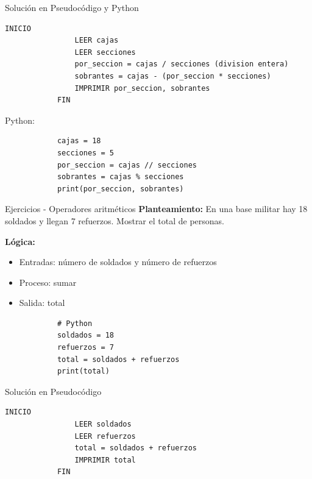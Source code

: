 \documentclass{beamer}
\begin{document}
    \begin{frame}[fragile]{Solución en Pseudocódigo y Python}
        \begin{lstlisting}[language=PseudocodigoES]
            INICIO
                LEER cajas
                LEER secciones
                por_seccion = cajas / secciones (division entera)
                sobrantes = cajas - (por_seccion * secciones)
                IMPRIMIR por_seccion, sobrantes
            FIN
        \end{lstlisting}
        Python:
        \begin{verbatim}
            cajas = 18
            secciones = 5
            por_seccion = cajas // secciones
            sobrantes = cajas % secciones
            print(por_seccion, sobrantes)
        \end{verbatim}
    \end{frame}

    \begin{frame}[fragile,t]{Ejercicios - Operadores aritméticos}
        \textbf{Planteamiento:} En una base militar hay 18 soldados y llegan 7 refuerzos. Mostrar el total de personas.

        \textbf{Lógica:} 
        \begin{itemize}
            \item Entradas: número de soldados y número de refuerzos
            \item Proceso: sumar
            \item Salida: total
        \end{itemize}
        \begin{verbatim}
            # Python
            soldados = 18
            refuerzos = 7
            total = soldados + refuerzos
            print(total)
        \end{verbatim}
    \end{frame}

    \begin{frame}[fragile]{Solución en Pseudocódigo}
        \begin{lstlisting}[language=PseudocodigoES]
            INICIO
                LEER soldados
                LEER refuerzos
                total = soldados + refuerzos
                IMPRIMIR total
            FIN
        \end{lstlisting}
    \end{frame}
\end{document}
